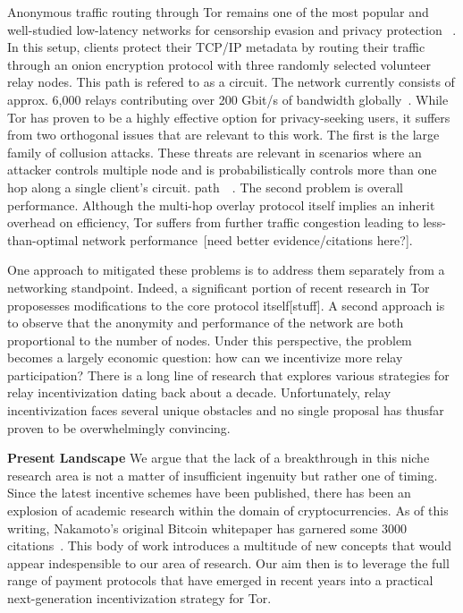 Anonymous traffic routing through Tor remains one of the most popular and
well-studied low-latency networks for censorship evasion and privacy protection
~\cite{dingledine2004tor}. In this setup, clients protect their TCP/IP metadata
by routing their traffic through an onion encryption protocol with three
randomly selected volunteer relay nodes. This path is refered to as a
circuit. The network currently consists of approx. 6,000 relays contributing
over 200 Gbit/s of bandwidth globally~\cite{portal2018tormetrics}. While Tor has
proven to be a highly effective option for privacy-seeking users, it suffers
from two orthogonal issues that are relevant to this work. The first is the
large family of collusion attacks. These threats are relevant in scenarios where
an attacker controls multiple node and is probabilistically controls more than
one hop along a single client's circuit.
path~\cite{wright2004predecessor}~\cite{murdoch2005low}. The second problem is
overall performance. Although the multi-hop overlay protocol itself implies an
inherit overhead on efficiency, Tor suffers from further traffic congestion
leading to less-than-optimal network
performance~\cite{portal2018tormetrics}[need better evidence/citations here?].

One approach to mitigated these problems is to address them separately from a
networking standpoint. Indeed, a significant portion of recent research in Tor
proposesses modifications to the core protocol itself[stuff]. A second approach
is to observe that the anonymity and performance of the network are both
proportional to the number of nodes. Under this perspective, the problem becomes
a largely economic question: how can we incentivize more relay participation?
There is a long line of research that explores various strategies for relay
incentivization dating back about a decade. Unfortunately, relay incentivization
faces several unique obstacles and no single proposal has thusfar proven to be
overwhelmingly convincing.

\textbf{Present Landscape} We argue that the lack of a breakthrough in this
niche research area is not a matter of insufficient ingenuity but rather one of
timing. Since the latest incentive schemes have been published, there has been
an explosion of academic research within the domain of cryptocurrencies. As of
this writing, Nakamoto's original Bitcoin whitepaper has garnered some 3000
citations~\cite{nakamoto2008bitcoin}. This body of work introduces a multitude
of new concepts that would appear indespensible to our area of research. Our
aim then is to leverage the full range of payment protocols that have emerged in
recent years into a practical next-generation incentivization strategy for Tor.

